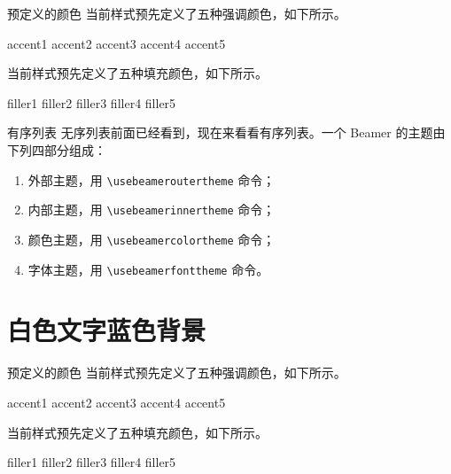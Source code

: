 \documentclass[14pt,notheorems,xcolor={rgb}]{beamer}
\begin{document}
\begin{frame}{预定义的颜色}
当前样式预先定义了五种强调颜色，如下所示。
\begin{flushleft}
\textcolor{accent1}{accent1}
\textcolor{accent2}{accent2}
\textcolor{accent3}{accent3}
\textcolor{accent4}{accent4}
\textcolor{accent5}{accent5}
\end{flushleft}
当前样式预先定义了五种填充颜色，如下所示。
\begin{flushleft}
\colorbox{filler1}{filler1}
\colorbox{filler2}{filler2}
\colorbox{filler3}{filler3}
\colorbox{filler4}{filler4}
\colorbox{filler5}{filler5}
\end{flushleft}
\end{frame}

\begin{frame}[fragile]{有序列表}
无序列表前面已经看到，现在来看看有序列表。一个 Beamer 的主题由下列四部分组成：\pause
\begin{enumerate}[<+->]
\item 外部主题，用 \verb!\usebeameroutertheme! 命令；
\item 内部主题，用 \verb!\usebeamerinnertheme! 命令；
\item 颜色主题，用 \verb!\usebeamercolortheme! 命令；
\item 字体主题，用 \verb!\usebeamerfonttheme! 命令。
\end{enumerate}
\end{frame}


\begin{frame}[plain]\transboxout
\titlepage
\end{frame}

\section{白色文字蓝色背景}

\begin{frame}{预定义的颜色}
当前样式预先定义了五种强调颜色，如下所示。
\begin{flushleft}
\textcolor{accent1}{accent1}
\textcolor{accent2}{accent2}
\textcolor{accent3}{accent3}
\textcolor{accent4}{accent4}
\textcolor{accent5}{accent5}
\end{flushleft}
当前样式预先定义了五种填充颜色，如下所示。
\begin{flushleft}
\colorbox{filler1}{filler1}
\colorbox{filler2}{filler2}
\colorbox{filler3}{filler3}
\colorbox{filler4}{filler4}
\colorbox{filler5}{filler5}
\end{flushleft}
\end{frame}
\end{document}
